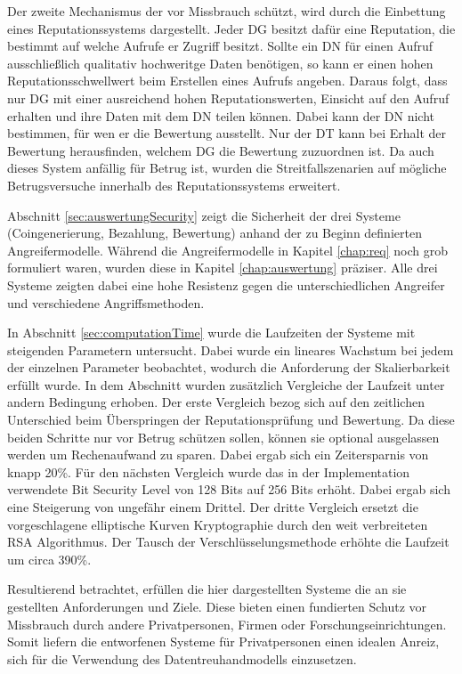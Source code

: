 \documentclass[
	fontsize=11pt,
	headings=small,
	parskip=half,           %
	bibliography=totoc,
	numbers=noenddot,       %
	open=any,               %
]{scrreprt}
\begin{document}
Der zweite Mechanismus der vor Missbrauch schützt, wird durch die Einbettung eines Reputationssystems dargestellt. Jeder DG besitzt dafür eine Reputation, die bestimmt auf welche Aufrufe er Zugriff besitzt. Sollte ein DN für einen Aufruf ausschließlich qualitativ hochweritge Daten benötigen, so kann er einen hohen Reputationsschwellwert beim Erstellen eines Aufrufs angeben. Daraus folgt, dass nur DG mit einer ausreichend hohen Reputationswerten, Einsicht auf den Aufruf erhalten und ihre Daten mit dem DN teilen können. Dabei kann der DN nicht bestimmen, für wen er die Bewertung ausstellt. Nur der DT kann bei Erhalt der Bewertung herausfinden, welchem DG die Bewertung zuzuordnen ist. Da auch dieses System anfällig für Betrug ist, wurden die Streitfallszenarien auf mögliche Betrugsversuche innerhalb des Reputationssystems erweitert. 

Abschnitt \ref{sec:auswertungSecurity} zeigt die Sicherheit der drei Systeme (Coingenerierung, Bezahlung, Bewertung) anhand der zu Beginn definierten Angreifermodelle. Während die Angreifermodelle in Kapitel \ref{chap:req} noch grob formuliert waren, wurden diese in Kapitel \ref{chap:auswertung} präziser. Alle drei Systeme zeigten dabei eine hohe Resistenz gegen die unterschiedlichen Angreifer und verschiedene Angriffsmethoden.

In Abschnitt \ref{sec:computationTime} wurde die Laufzeiten der Systeme mit steigenden Parametern untersucht. Dabei wurde ein lineares Wachstum bei jedem der einzelnen Parameter beobachtet, wodurch die Anforderung der Skalierbarkeit erfüllt wurde. In dem Abschnitt wurden zusätzlich Vergleiche der Laufzeit unter andern Bedingung erhoben. Der erste Vergleich bezog sich auf den zeitlichen Unterschied beim Überspringen der Reputationsprüfung und Bewertung. Da diese beiden Schritte nur vor Betrug schützen sollen, können sie optional ausgelassen werden um Rechenaufwand zu sparen. Dabei ergab sich ein Zeitersparnis von knapp 20\%. Für den nächsten Vergleich wurde das in der Implementation verwendete Bit Security Level von 128 Bits auf 256 Bits erhöht. Dabei ergab sich eine Steigerung von ungefähr einem Drittel. Der dritte Vergleich ersetzt die vorgeschlagene elliptische Kurven Kryptographie durch den weit verbreiteten RSA Algorithmus. Der Tausch der Verschlüsselungsmethode erhöhte die Laufzeit um circa 390\%.

Resultierend betrachtet, erfüllen die hier dargestellten Systeme die an sie gestellten Anforderungen und Ziele. Diese bieten einen fundierten Schutz vor Missbrauch durch andere Privatpersonen, Firmen oder Forschungseinrichtungen. Somit liefern die entworfenen Systeme für Privatpersonen einen idealen Anreiz, sich für die Verwendung des Datentreuhandmodells einzusetzen.
\end{document}
